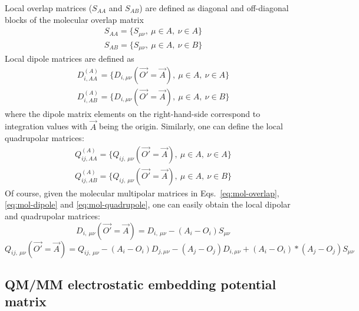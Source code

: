 \documentclass[aip,jcp,preprint,superscriptaddress,amsmath,amssymb]{revtex4-1}
\begin{document}
Local overlap matrices ($S_{AA}$ and $S_{AB}$) are defined as diagonal and off-diagonal blocks of the molecular overlap matrix
\begin{eqnarray}
S_{AA} = \{ S_{\mu \nu}, ~\mu \in A, ~\nu \in A \}   \\
S_{AB} = \{ S_{\mu \nu}, ~\mu \in A, ~\nu \in B \}  
\end{eqnarray}
Local dipole matrices are defined as
\begin{eqnarray}
D_{i,AA}^{(A)} = \{ D_{i, \mu \nu } ( \vec{O'} = \vec{A}), ~\mu \in A, ~\nu \in A \}  \\
D_{i, AB}^{(A)} = \{ D_{i, \mu \nu} ( \vec{O'} = \vec{A}), ~\mu \in A, ~\nu \in B \} 
\end{eqnarray}
where the dipole matrix elements on the right-hand-side correspond to integration values with $\vec{A}$ being the origin.  
Similarly, one can define the local quadrupolar matrices: 
\begin{eqnarray}
Q_{ij,AA}^{(A)} = \{ Q_{ij, ~\mu\nu } ( \vec{O'} = \vec{A}), ~\mu \in A, ~\nu \in A \} \\
Q_{ij, AB}^{(A)} = \{ Q_{ij, ~\mu\nu} ( \vec{O'} = \vec{A}), ~\mu \in A, ~\nu \in B \}   
\end{eqnarray}
Of course, given the molecular multipolar matrices in Eqs.~\ref{eq:mol-overlap}, \ref{eq:mol-dipole} and \ref{eq:mol-quadrupole}, 
one can easily obtain the local dipolar and quadrupolar matrices:
\begin{equation}
 D_{i, ~\mu\nu} ( \vec{O'} = \vec{A})   
 =   D_{i, ~\mu\nu} 
 - (A_i - O_i  )  S_{\mu \nu}   
 \end{equation}
 \begin{equation}
 Q_{ij, ~\mu\nu} ( \vec{O'} = \vec{A})   
 =   Q_{ij, ~\mu\nu} 
 - (A_i - O_i  ) D_{j, \mu \nu}  -  (A_j - O_j  ) D_{i, \mu \nu} 
 + (A_i - O_i  ) *  (A_j - O_j  ) S_{\mu \nu} 
\end{equation}

\subsection{QM/MM electrostatic embedding potential matrix}
\end{document}
